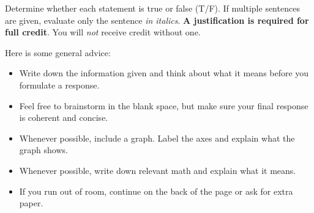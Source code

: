 \documentclass[11pt, a4]{exam}
\begin{document}
\newpage
\begin{questions}

 Determine whether each statement is true or false (T/F). If multiple sentences are given, evaluate only the sentence \emph{in italics}. \textbf{A justification is required for full credit}. You will \emph{not} receive credit without one.

Here is some general advice:
\begin{itemize}
\item Write down the information given and think about what it means before you formulate a response.
\item Feel free to brainstorm in the blank space, but make sure your final response is coherent and concise.
\item Whenever possible, include a graph. Label the axes and explain what the graph shows.
\item Whenever possible, write down relevant math and explain what it means.
\item If you run out of room, continue on the back of the page or ask for extra paper.
\end{itemize}


\bigskip

\bigskip
\begin{parts}


\end{parts}
\end{questions}
\end{document}
